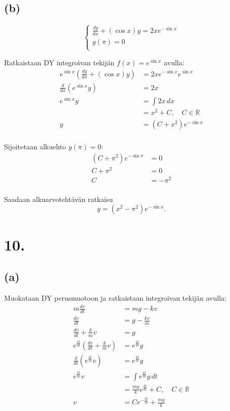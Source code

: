 \documentclass{article}
\begin{document}
\subsection*{(b)}

\[
  \begin{cases}
    \frac{dy}{dx} + (\cos x)y = 2xe^{-\sin x} \\
    y(\pi) = 0 \\
  \end{cases}
\]

Ratkaistaan DY integroivan tekijän $f(x) = e^{\sin x}$ avulla:
\begin{align*}
  e^{\sin x}(\frac{dy}{dx} + (\cos x)y) &= 2xe^{-\sin x}e^{\sin x} \\
  \frac{d}{dx}(e^{\sin x}y) &= 2x \\
  e^{\sin x}y &= \int 2x\,dx \\
              &= x^2 + C, \quad C \in \mathbb{R} \\
  y &= (C + x^2)e^{-\sin x} \\
\end{align*}

Sijoitetaan alkuehto $y(\pi) = 0$:
\begin{align*}
  (C + \pi^2)e^{-\sin \pi} &= 0 \\
  C + \pi^2 &= 0 \\
  C &= -\pi^2 \\
\end{align*}

Saadaan alkuarvotehtävän ratkaisu
\[
  y = (x^2 - \pi^2)e^{-\sin x}.
\]

\section*{10.}

\subsection*{(a)}

Muokataan DY perusmuotoon ja ratkaistaan integroivan tekijän avulla:
\begin{align*}
  m\frac{dv}{dt} &= mg - kv \\
  \frac{dv}{dt} &= g - \frac{kv}{m} \\
  \frac{dv}{dt} + \frac{k}{m}v &= g \\
  e^{\frac{kt}{m}}(\frac{dv}{dt} + \frac{k}{m}v) &= e^{\frac{kt}{m}}g \\
  \frac{d}{dt}(e^{\frac{kt}{m}}v) &= e^{\frac{kt}{m}}g \\
  e^{\frac{kt}{m}}v &= \int e^{\frac{kt}{m}}g\,dt \\
                    &= \frac{mg}{k}e^{\frac{kt}{m}} + C, \quad C \in \mathbb{R} \\
  v &= Ce^{-\frac{kt}{m}} + \frac{mg}{k} \\
\end{align*}
\end{document}
